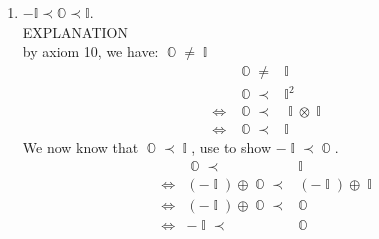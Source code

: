 \documentclass[11pt]{article}
\numberwithin{equation}{section}
\DeclareMathOperator*{\OO}{\mathbb{O}}
\DeclareMathOperator*{\II}{\mathbb{I}}
\DeclareMathOperator*{\+}{\oplus}
\DeclareMathOperator*{\x}{\otimes}
\DeclareMathOperator*{\fl}{\prec} %
\DeclareMathOperator*{\Lra}{\Leftrightarrow}
\begin{document}
\begin{enumerate}[label= 1.\arabic*, itemsep=0.2cm]
     \item %
      $- \mathbb{I} \prec \mathbb{O} \prec \mathbb{I}$.\\
      EXPLANATION\\
      by axiom 10, we have: $\OO \neq \II$ 
      \begin{align*}
       &&  \OO \neq& \II \\
       &&   \OO \fl& {\II}^2 \\ %
       &\Lra& \OO \fl& \II \x \II \\%
       &\Lra& \OO \fl& \II %
      \end{align*}
      We now know that $\OO \fl \II$, use to show $-\II \fl \OO$.
      \begin{align*}
        && \OO \fl& \II \\
        &\Lra& (-\II)\+\OO \fl&(-\II) \+ \II \\ %
        &\Lra& (-\II)\+\OO \fl& \OO \\%
        &\Lra& -\II \fl& \OO %
      \end{align*}



\end{enumerate}
\end{document}
